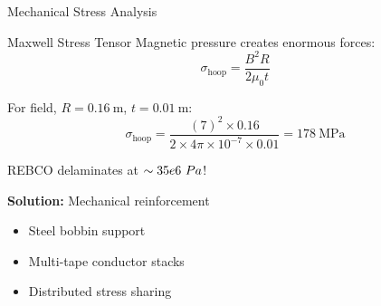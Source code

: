 \begin{frame}{Mechanical Stress Analysis}
    \begin{block}{Maxwell Stress Tensor}
        Magnetic pressure creates enormous forces:
        \begin{equation}
            \sigma_{\text{hoop}} = \frac{B^2 R}{2 \mu_0 t}
        \end{equation}
        
        For  field, $R = 0.16~\text{m}$, $t = 0.01~\text{m}$:
        \begin{equation}
            \sigma_{\text{hoop}} = \frac{(7)^2 \times 0.16}{2 \times 4\pi \times 10^{-7} \times 0.01} = 178~\text{MPa}
        \end{equation}
    \end{block}
    
    \vspace{0.3cm}
     REBCO delaminates at $\sim35e6~Pa$!
    
    \textbf{Solution:} Mechanical reinforcement
    \begin{itemize}
        \item Steel bobbin support
        \item Multi-tape conductor stacks
        \item Distributed stress sharing
    \end{itemize}
\end{frame}


